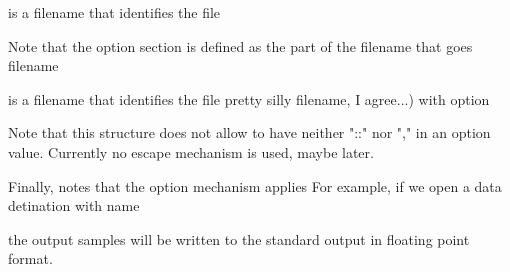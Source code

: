 \documentclass{article}
\begin{document}
    is a filename that identifies the file



    Note that the option section is defined as the part of the filename
    that goes
    filename






    is a filename that identifies the file
    pretty silly filename, I agree...) with option



    Note that this structure does not allow to have neither "::" nor ","  in an option
    value.  Currently no escape mechanism is used, maybe later.



    Finally, notes that the option mechanism applies
    For example, if we open a data detination with name






    the output samples will be written to the standard output
    in floating point format.
\end{document}
